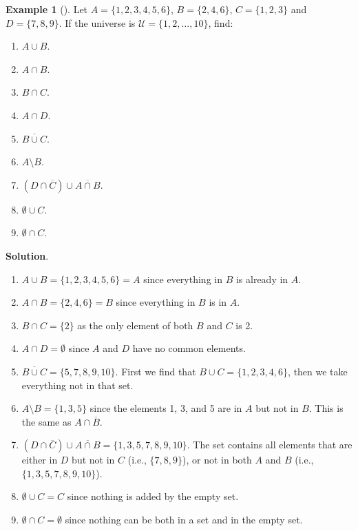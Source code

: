 \documentclass[10pt,]{book}
\theoremstyle{plain}
\theoremstyle{definition}
\theoremstyle{definition}
\newtheorem{example}[theorem]{Example}
\theoremstyle{definition}
\theoremstyle{definition}
\numberwithin{equation}{chapter}
\def\U{\mathcal U}
\def\bar{\overline}
\begin{document}
\begin{example}[]\label{example-43}
\hypertarget{p-1515}{}%
Let \(A = \{1, 2, 3, 4, 5, 6\}\), \(B = \{2, 4, 6\}\), \(C = \{1, 2, 3\}\) and \(D = \{7, 8, 9\}\). If the universe is \(\U = \{1, 2, \ldots, 10\}\), find: \leavevmode%
\begin{enumerate}
\item\hypertarget{li-464}{}\(A \cup B\).%
\item\hypertarget{li-465}{}\(A \cap B\).%
\item\hypertarget{li-466}{}\(B \cap C\).%
\item\hypertarget{li-467}{}\(A \cap D\).%
\item\hypertarget{li-468}{}\(\bar{B \cup C}\).%
\item\hypertarget{li-469}{}\(A \setminus B\).%
\item\hypertarget{li-470}{}\((D \cap \bar C) \cup \bar{A \cap B}\).%
\item\hypertarget{li-471}{}\(\emptyset \cup C\).%
\item\hypertarget{li-472}{}\(\emptyset \cap C\).%
\end{enumerate}
%
\par\smallskip%
\noindent\textbf{Solution}.\hypertarget{solution-132}{}\quad%
\hypertarget{p-1516}{}%
\leavevmode%
\begin{enumerate}
\item\hypertarget{li-473}{}\(A \cup B = \{1, 2, 3, 4, 5, 6\} = A\) since everything in \(B\) is already in \(A\).%
\item\hypertarget{li-474}{}\(A \cap B = \{2, 4, 6\} = B\) since everything in \(B\) is in \(A\).%
\item\hypertarget{li-475}{}\(B \cap C = \{2\}\) as the only element of both \(B\) and \(C\) is 2.%
\item\hypertarget{li-476}{}\(A \cap D = \emptyset\) since \(A\) and \(D\) have no common elements.%
\item\hypertarget{li-477}{}\(\bar{B \cup C} = \{5, 7, 8, 9, 10\}\). First we find that \(B \cup C = \{1, 2, 3, 4, 6\}\), then we take everything not in that set.%
\item\hypertarget{li-478}{}\(A \setminus B = \{1, 3, 5\}\) since the elements 1, 3, and 5 are in \(A\) but not in \(B\). This is the same as \(A \cap \bar B\).%
\item\hypertarget{li-479}{}\((D \cap \bar C) \cup \bar{A \cap B} = \{1, 3, 5, 7, 8, 9, 10\}.\) The set contains all elements that are either in \(D\) but not in \(C\) (i.e., \(\{7,8,9\}\)), or not in both \(A\) and \(B\) (i.e., \(\{1,3,5,7,8,9,10\}\)).%
\item\hypertarget{li-480}{}\(\emptyset \cup C = C\) since nothing is added by the empty set.%
\item\hypertarget{li-481}{}\(\emptyset \cap C = \emptyset\) since nothing can be both in a set and in the empty set.%
\end{enumerate}
%
\end{example}
\end{document}
